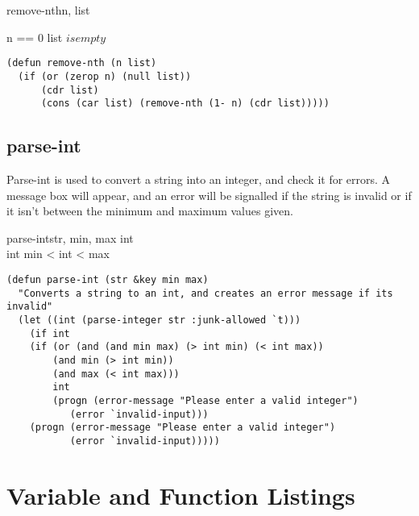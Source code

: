 \begin{pseudocode}{remove-nth}{n, list}
	\ENDPROCEDURE

	\ENDPROCEDURE

	\ENDPROCEDURE

	\MAIN
	\IF n == 0 \OR list $ is empty$ 
	\THEN {} 
	\ELSE
	\ENDMAIN
\end{pseudocode}
\begin{lstlisting}
(defun remove-nth (n list)
  (if (or (zerop n) (null list))
      (cdr list)
      (cons (car list) (remove-nth (1- n) (cdr list)))))
\end{lstlisting}

\subsection{parse-int}
Parse-int is used to convert a string into an integer, and check it for errors.
A message box will appear, and an error will be signalled if the string is
invalid or if it isn't between the minimum and maximum values given.

\begin{pseudocode}{parse-int}{str, min, max}
	int \GETS {}  \\
	\IF int 
	\THEN \BEGIN \IF min < int < max 
		\THEN {} 
		\ELSE {} \END
	\ELSE {} 
\end{pseudocode}

\begin{lstlisting}
(defun parse-int (str &key min max)
  "Converts a string to an int, and creates an error message if its invalid"
  (let ((int (parse-integer str :junk-allowed `t)))
    (if int
	(if (or (and (and min max) (> int min) (< int max))
		(and min (> int min))
		(and max (< int max)))
	    int
	    (progn (error-message "Please enter a valid integer")
		   (error `invalid-input)))
	(progn (error-message "Please enter a valid integer")
	       (error `invalid-input)))))
\end{lstlisting}

\section{Variable and Function Listings}
